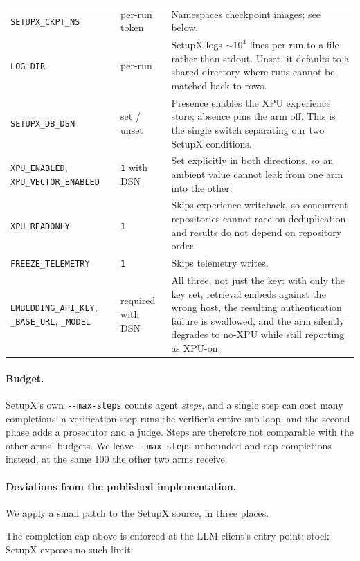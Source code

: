 \begin{table}[h]
\begin{tabularx}{\linewidth}{@{}Y{0.95}Y{0.70}Y{1.35}@{}}
\texttt{SETUPX\_CKPT\_NS} & per-run token &
  Namespaces checkpoint images; see below. \\
\texttt{LOG\_DIR} & per-run &
  SetupX logs ${\sim}10^4$ lines per run to a file rather than stdout. Unset, it
  defaults to a shared directory where runs cannot be matched back to rows. \\
\texttt{SETUPX\_DB\_DSN} & set / unset &
  Presence enables the XPU experience store; absence pins the arm off. This is
  the single switch separating our two SetupX conditions. \\
\texttt{XPU\_ENABLED}, \texttt{XPU\_VECTOR\_ENABLED} & \texttt{1} with DSN &
  Set explicitly in both directions, so an ambient value cannot leak from one
  arm into the other. \\
\texttt{XPU\_READONLY} & \texttt{1} &
  Skips experience writeback, so concurrent repositories cannot race on
  deduplication and results do not depend on repository order. \\
\texttt{FREEZE\_TELEMETRY} & \texttt{1} & Skips telemetry writes. \\
\texttt{EMBEDDING\_API\_KEY}, \texttt{\_BASE\_URL}, \texttt{\_MODEL} &
  required with DSN &
  All three, not just the key: with only the key set, retrieval embeds against
  the wrong host, the resulting authentication failure is swallowed, and the arm
  silently degrades to no-XPU while still reporting as XPU-on. \\
\bottomrule
\end{tabularx}
\end{table}

\paragraph{Budget.}
SetupX's own \texttt{-{}-max-steps} counts agent \emph{steps}, and a single step
can cost many completions: a verification step runs the verifier's entire
sub-loop, and the second phase adds a prosecutor and a judge. Steps are
therefore not comparable with the other arms' budgets. We leave
\texttt{-{}-max-steps} unbounded and cap completions instead, at the same 100
the other two arms receive.

\paragraph{Deviations from the published implementation.}
We apply a small patch to the SetupX source, in three places.

The completion cap above is enforced at the LLM client's entry point; stock
SetupX exposes no such limit.

